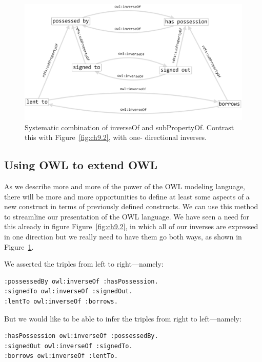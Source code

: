 \begin{figure}
\centering
\includegraphics[width=5in]{SWWOv3/media/ch9/figure9-3.png}
\caption{Systematic combination of inverseOf and subPropertyOf. Contrast this
with Figure~\ref{fig:ch9.2}, with one- directional inverses.
}
\label{fig:ch9.3}
\end{figure}



\subsection{Using OWL to extend OWL}

As we describe more and more of the power of the OWL modeling language,
there will be more and more opportunities to define at least some
aspects of a new construct in terms of previously defined constructs. We
can use this method to streamline our presentation of the OWL language.
We have seen a need for this already in figure Figure~\ref{fig:ch9.2}, in which all
of our inverses are expressed in one direction but we really need to
have them go both ways, as shown in Figure~\ref{fig:ch9.3}.

We asserted the triples from left to right---namely:

\begin{lstlisting}
:possessedBy owl:inverseOf :hasPossession.
:signedTo owl:inverseOf :signedOut.
:lentTo owl:inverseOf :borrows.
\end{lstlisting}

But we would like to be able to infer the triples from right to
left---namely:

\begin{lstlisting}
:hasPossession owl:inverseOf :possessedBy.
:signedOut owl:inverseOf :signedTo.
:borrows owl:inverseOf :lentTo.
\end{lstlisting}

